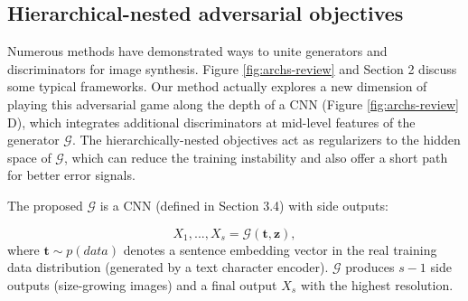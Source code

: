 \documentclass[10pt,twocolumn,letterpaper]{article}
\begin{document}
\subsection{Hierarchical-nested adversarial objectives}
Numerous methods have demonstrated ways to unite generators and discriminators for image synthesis. Figure \ref{fig:archs-review} and Section 2 discuss some typical frameworks.
Our method actually explores a new dimension of playing this adversarial game along the depth of a CNN (Figure \ref{fig:archs-review} D), which integrates additional discriminators at mid-level features of the generator $\mathcal{G}$. 
The hierarchically-nested objectives 
act as regularizers to the hidden space of $\mathcal{G}$, which can reduce the training instability and also offer a short path for better error signals.

The proposed $\mathcal{G}$ is a CNN (defined in Section 3.4) with side outputs:

\begin{equation}
\label{side}
X_1,..., X_s = \mathcal{G}(\bm t, \bm z), 
\end{equation}
where  $\bm t\sim p(data)$ denotes a sentence embedding vector in the real training data distribution (generated by a text character encoder). $\mathcal{G}$ produces $s-1$ side outputs (size-growing images) and a final output $X_s$ with the highest resolution.

\end{document}
